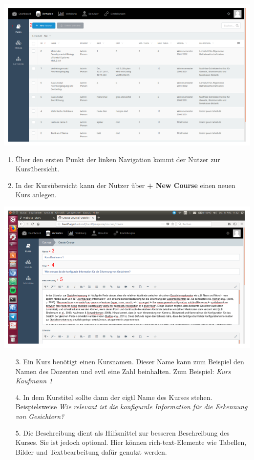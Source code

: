     \includegraphics[scale=0.3]{backend/img/verwalten_kurse.png}
    \begin{enumerate}
     \item Über den ersten Punkt der linken Navigation kommt der Nutzer zur Kursübersicht.
     \item In der Kursübersicht kann der Nutzer über \textbf{+ New Course} einen neuen Kurs anlegen. 
    \end{enumerate}
    
    \includegraphics[scale=0.3]{backend/img/create_course_1.png}
    \begin{enumerate}
     \item[3.] Ein Kurs benötigt einen Kursnamen. Dieser Name kann zum Beispiel den Namen des Dozenten und evtl eine Zahl beinhalten. Zum Beispiel: \textit{Kurs Kaufmann 1}
     \item[4.] In dem Kurstitel sollte dann der eigtl Name des Kurses stehen. Beispielsweise \textit{Wie relevant ist die konfigurale Information für die Erkennung von Gesichtern?}
     \item[5.] Die Beschreibung dient als Hilfsmittel zur besseren Beschreibung des Kurses. Sie ist jedoch optional.
	       Hier können rich-text-Elemente wie Tabellen, Bilder und Textbearbeitung dafür genutzt werden.
    \end{enumerate}

